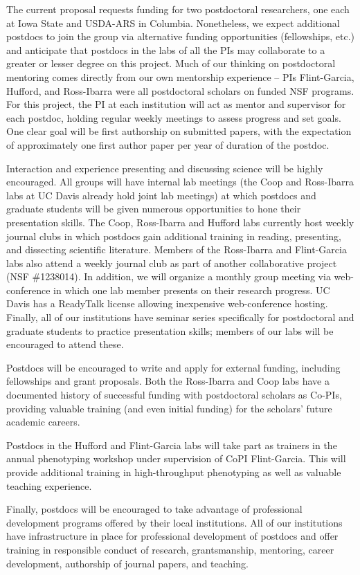 The current proposal requests funding for two postdoctoral researchers, one each at Iowa State and USDA-ARS in Columbia. Nonetheless, we expect additional postdocs to join the group via alternative funding opportunities (fellowships, etc.) and anticipate that postdocs in the labs of all the PIs may collaborate to a greater or lesser degree on this project.  Much of our thinking on postdoctoral mentoring comes directly from our own mentorship experience -- PIs Flint-Garcia, Hufford, and Ross-Ibarra were all postdoctoral scholars on funded NSF programs. For this project, the PI at each institution will act as mentor and supervisor for each postdoc, holding regular weekly meetings to assess progress and set goals.  One clear goal will be first authorship on submitted papers, with the expectation of approximately one first author paper per year of duration of the postdoc. 

Interaction and experience presenting and discussing science will be highly encouraged. All groups will have internal lab meetings (the Coop and Ross-Ibarra labs at UC Davis already hold joint lab meetings) at which postdocs and graduate students will be given numerous opportunities to hone their presentation skills.  The Coop, Ross-Ibarra and Hufford labs currently host weekly journal clubs in which postdocs gain additional training in reading, presenting, and dissecting scientific literature. Members of the Ross-Ibarra and Flint-Garcia labs also attend a weekly journal club as part of another collaborative project (NSF \#1238014). In addition, we will organize a monthly group meeting via web-conference in which one lab member presents on their research progress.  UC Davis has a ReadyTalk license allowing inexpensive web-conference hosting. Finally, all of our institutions have seminar series specifically for postdoctoral and graduate students to practice presentation skills; members of our labs will be encouraged to attend these.

Postdocs will be encouraged to write and apply for external funding, including fellowships and grant proposals.  Both the Ross-Ibarra and Coop labs have a documented history of successful funding with postdoctoral scholars as Co-PIs, providing valuable training (and even initial funding) for the scholars' future academic careers.

Postdocs in the Hufford and Flint-Garcia labs will take part as trainers in the annual phenotyping workshop under supervision of CoPI Flint-Garcia.  This will provide additional training in high-throughput phenotyping as well as valuable teaching experience.

Finally, postdocs will be encouraged to take advantage of professional development programs offered by their local institutions. All of our institutions have infrastructure in place for professional development of postdocs and offer training in responsible conduct of research, grantsmanship, mentoring, career development, authorship of journal papers, and teaching. 


